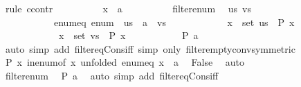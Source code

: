 \begin{isabellebody}
\ {\isacharparenleft}{\kern0pt}rule\ ccontr{\isacharparenright}{\kern0pt}\isanewline
\ \ \ \ \ \ \ \ \isamarkupfalse%
\ {\isachardoublequoteopen}x\ {\isasymnoteq}\ a{\isachardoublequoteclose}\isanewline
\ \ \ \ \ \ \ \ \isamarkupfalse%
\ filter{\isacharunderscore}{\kern0pt}enum\ \isamarkupfalse%
\ us\ vs\isanewline
\ \ \ \ \ \ \ \ \ \ \ enum{\isacharunderscore}{\kern0pt}eq{\isacharcolon}{\kern0pt}\ {\isachardoublequoteopen}enum\ {\isacharequal}{\kern0pt}\ us\ {\isacharat}{\kern0pt}\ {\isacharbrackleft}{\kern0pt}a{\isacharbrackright}{\kern0pt}\ {\isacharat}{\kern0pt}\ vs{\isachardoublequoteclose}\isanewline
\ \ \ \ \ \ \ \ \ \ \ {\isachardoublequoteopen}{\isasymforall}\ x\ {\isasymin}\ set\ us{\isachardot}{\kern0pt}\ {\isasymnot}\ P\ x{\isachardoublequoteclose}\isanewline
\ \ \ \ \ \ \ \ \ \ \ {\isachardoublequoteopen}{\isasymforall}\ x\ {\isasymin}\ set\ vs{\isachardot}{\kern0pt}\ {\isasymnot}\ P\ x{\isachardoublequoteclose}\isanewline
\ \ \ \ \ \ \ \ \ \ \ {\isachardoublequoteopen}P\ a{\isachardoublequoteclose}\isanewline
\ \ \ \ \ \ \ \ \ \ \isamarkupfalse%
\ {\isacharparenleft}{\kern0pt}auto\ simp\ add{\isacharcolon}{\kern0pt}\ filter{\isacharunderscore}{\kern0pt}eq{\isacharunderscore}{\kern0pt}Cons{\isacharunderscore}{\kern0pt}iff{\isacharparenright}{\kern0pt}\ {\isacharparenleft}{\kern0pt}simp\ only{\isacharcolon}{\kern0pt}\ filter{\isacharunderscore}{\kern0pt}empty{\isacharunderscore}{\kern0pt}conv{\isacharbrackleft}{\kern0pt}symmetric{\isacharbrackright}{\kern0pt}{\isacharparenright}{\kern0pt}\isanewline
\ \ \ \ \ \ \ \ \isamarkupfalse%
\ {\isacartoucheopen}P\ x{\isacartoucheclose}\ in{\isacharunderscore}{\kern0pt}enum{\isacharbrackleft}{\kern0pt}of\ x{\isacharcomma}{\kern0pt}\ unfolded\ enum{\isacharunderscore}{\kern0pt}eq{\isacharbrackright}{\kern0pt}\ {\isacartoucheopen}x\ {\isasymnoteq}\ a{\isacartoucheclose}\ \isamarkupfalse%
\ {\isachardoublequoteopen}False{\isachardoublequoteclose}\ \isamarkupfalse%
\ auto\isanewline
\ \ \ \ \ \ \isamarkupfalse%
\isanewline
\ \ \ \ \isamarkupfalse%
\isanewline
\ \ \ \ \ \ \isamarkupfalse%
\ filter{\isacharunderscore}{\kern0pt}enum\ \isamarkupfalse%
\ {\isachardoublequoteopen}P\ a{\isachardoublequoteclose}\ \isamarkupfalse%
\ {\isacharparenleft}{\kern0pt}auto\ simp\ add{\isacharcolon}{\kern0pt}\ filter{\isacharunderscore}{\kern0pt}eq{\isacharunderscore}{\kern0pt}Cons{\isacharunderscore}{\kern0pt}iff{\isacharparenright}{\kern0pt}\isanewline

\end{isabellebody}
